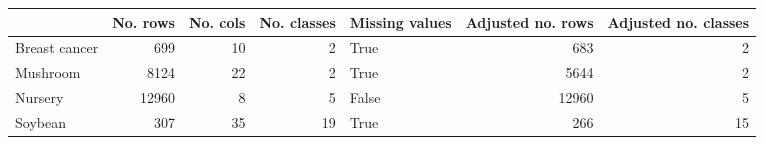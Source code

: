 \begin{tabular}{lrrrlrr}
\toprule
{} &  No. rows &  No. cols &  No. classes &  Missing values &  Adjusted no. rows &  Adjusted no. classes \\
\midrule
Breast cancer &       699 &        10 &            2 &            True &                683 &                     2 \\
Mushroom      &      8124 &        22 &            2 &            True &               5644 &                     2 \\
Nursery       &     12960 &         8 &            5 &           False &              12960 &                     5 \\
Soybean       &       307 &        35 &           19 &            True &                266 &                    15 \\
\bottomrule
\end{tabular}
